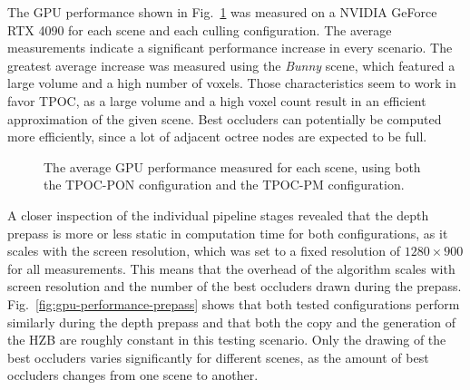 \documentclass[conference]{IEEEtran}
\begin{document}
\noindent
The \ac{GPU} performance shown in Fig.~\ref{fig:gpu-performance-full} was measured on a NVIDIA GeForce RTX 4090 
for each scene and each culling configuration. The average measurements indicate a significant performance 
increase in every scenario. The greatest average increase was measured using the \emph{Bunny} scene, which 
featured a large volume and a high number of voxels. Those characteristics seem to work in favor \ac{TPOC}, 
as a large volume and a high voxel count result in an efficient approximation of the given scene. Best occluders 
can potentially be computed more efficiently, since a lot of adjacent octree nodes are expected to be full. \\

\begin{figure}
    \begin{center}
    \end{center}
    \caption{The average \ac{GPU} performance measured for each scene, using both the \ac{TPOC-PON} 
    configuration and the \ac{TPOC-PM} configuration.}
    \label{fig:gpu-performance-full}
\end{figure}

\noindent
A closer inspection of the individual pipeline stages revealed that the depth prepass is more or less static in 
computation time for both configurations, as it scales with the screen resolution, which was set to a fixed 
resolution of $1280 \times 900$ for all measurements. This means that the overhead of the algorithm scales 
with screen resolution and the number of the best occluders drawn during the prepass. 
Fig.~\ref{fig:gpu-performance-prepass} shows that both tested configurations perform similarly during the 
depth prepass and that both the copy and the generation of the \ac{HZB} are roughly constant in this testing 
scenario. Only the drawing of the best occluders varies significantly for different scenes, as the amount of 
best occluders changes from one scene to another. \\
\end{document}
